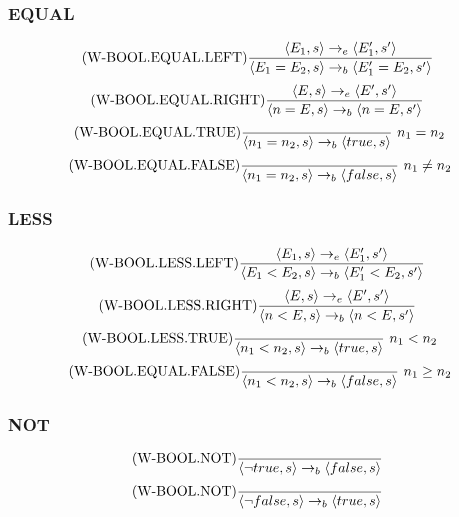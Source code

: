 \documentclass{report}
\begin{document}
\subsubsection*{EQUAL}
\[\text{(W-BOOL.EQUAL.LEFT)}\dfrac{\langle E_1, s \rangle \to_e \langle E'_1, s' \rangle}{\langle E_1 = E_2, s \rangle \to_b \langle E'_1 = E_2, s' \rangle} \ \]
\[\text{(W-BOOL.EQUAL.RIGHT)}\dfrac{\langle E, s \rangle \to_e \langle E', s' \rangle}{\langle n = E, s \rangle \to_b \langle n = E, s' \rangle} \ \]
\[\text{(W-BOOL.EQUAL.TRUE)}\dfrac{}{\langle n_1 = n_2, s \rangle \to_b \langle true, s \rangle} \ n_1 = n_2\]
\[\text{(W-BOOL.EQUAL.FALSE)}\dfrac{}{\langle n_1 = n_2, s \rangle \to_b \langle false, s \rangle} \ n_1 \neq n_2\]
\subsubsection*{LESS}
\[\text{(W-BOOL.LESS.LEFT)}\dfrac{\langle E_1, s \rangle \to_e \langle E'_1, s' \rangle}{\langle E_1 < E_2, s \rangle \to_b \langle E'_1 < E_2, s' \rangle} \ \]
\[\text{(W-BOOL.LESS.RIGHT)}\dfrac{\langle E, s \rangle \to_e \langle E', s' \rangle}{\langle n < E, s \rangle \to_b \langle n < E, s' \rangle} \ \]
\[\text{(W-BOOL.LESS.TRUE)}\dfrac{}{\langle n_1 < n_2, s \rangle \to_b \langle true, s \rangle} \ n_1 < n_2\]
\[\text{(W-BOOL.EQUAL.FALSE)}\dfrac{}{\langle n_1 < n_2, s \rangle \to_b \langle false, s \rangle} \ n_1 \geq n_2\]
\subsubsection*{NOT}
\[\text{(W-BOOL.NOT)}\dfrac{}{\langle \neg true, s \rangle \to_b \langle false, s \rangle} \ \]
\[\text{(W-BOOL.NOT)}\dfrac{}{\langle \neg false, s \rangle \to_b \langle true, s \rangle} \ \]
\end{document}
